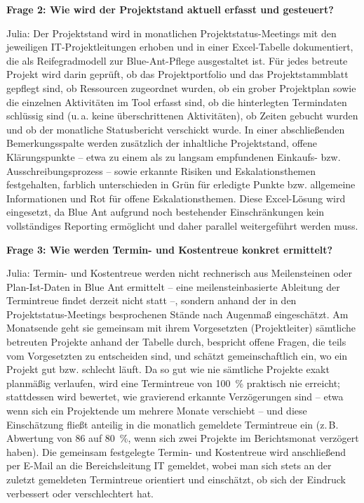 \documentclass[
    12pt, 
    a4paper,
    ]{scrartcl} %
\begin{document}
\bigskip
{}

\textbf{Frage 2: Wie wird der Projektstand aktuell erfasst und gesteuert?}

Julia: Der Projektstand wird in monatlichen Projektstatus-Meetings mit den jeweiligen IT-Projektleitungen erhoben und in einer Excel-Tabelle dokumentiert, die als Reifegradmodell zur Blue-Ant-Pflege ausgestaltet ist. Für jedes betreute Projekt wird darin geprüft, ob das Projektportfolio und das Projektstammblatt gepflegt sind, ob Ressourcen zugeordnet wurden, ob ein grober Projektplan sowie die einzelnen Aktivitäten im Tool erfasst sind, ob die hinterlegten Termindaten schlüssig sind (u.\,a. keine überschrittenen Aktivitäten), ob Zeiten gebucht wurden und ob der monatliche Statusbericht verschickt wurde. In einer abschließenden Bemerkungsspalte werden zusätzlich der inhaltliche Projektstand, offene Klärungspunkte -- etwa zu einem als zu langsam empfundenen Einkaufs- bzw. Ausschreibungsprozess -- sowie erkannte Risiken und Eskalationsthemen festgehalten, farblich unterschieden in Grün für erledigte Punkte bzw. allgemeine Informationen und Rot für offene Eskalationsthemen. Diese Excel-Lösung wird eingesetzt, da Blue Ant aufgrund noch bestehender Einschränkungen kein vollständiges Reporting ermöglicht und daher parallel weitergeführt werden muss.

\textbf{Frage 3: Wie werden Termin- und Kostentreue konkret ermittelt?}

Julia: Termin- und Kostentreue werden nicht rechnerisch aus Meilensteinen oder Plan-Ist-Daten in Blue Ant ermittelt -- eine meilensteinbasierte Ableitung der Termintreue findet derzeit nicht statt --, sondern anhand der in den Projektstatus-Meetings besprochenen Stände nach Augenmaß eingeschätzt. Am Monatsende geht sie gemeinsam mit ihrem Vorgesetzten (Projektleiter) sämtliche betreuten Projekte anhand der Tabelle durch, bespricht offene Fragen, die teils vom Vorgesetzten zu entscheiden sind, und schätzt gemeinschaftlich ein, wo ein Projekt gut bzw. schlecht läuft. Da so gut wie nie sämtliche Projekte exakt planmäßig verlaufen, wird eine Termintreue von 100~\% praktisch nie erreicht; stattdessen wird bewertet, wie gravierend erkannte Verzögerungen sind -- etwa wenn sich ein Projektende um mehrere Monate verschiebt -- und diese Einschätzung fließt anteilig in die monatlich gemeldete Termintreue ein (z.\,B. Abwertung von 86 auf 80~\%, wenn sich zwei Projekte im Berichtsmonat verzögert haben). Die gemeinsam festgelegte Termin- und Kostentreue wird anschließend per E-Mail an die Bereichsleitung IT gemeldet, wobei man sich stets an der zuletzt gemeldeten Termintreue orientiert und einschätzt, ob sich der Eindruck verbessert oder verschlechtert hat.
\end{document}
